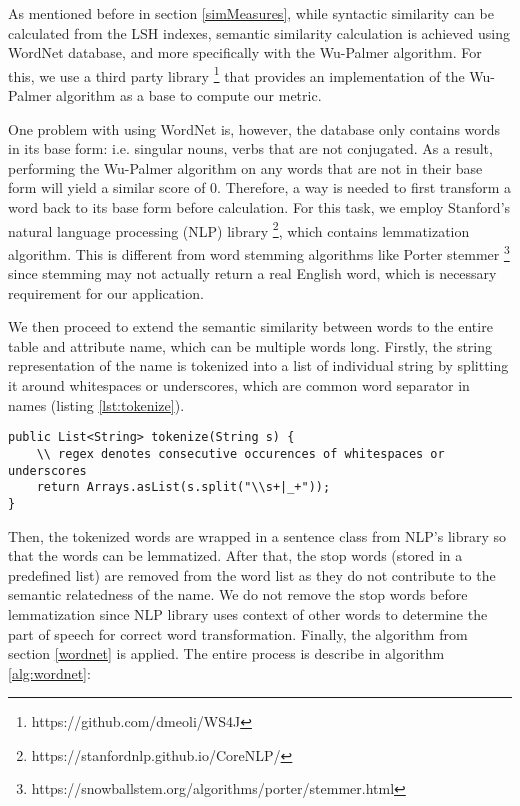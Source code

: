 As mentioned before in section \ref{simMeasures}, while syntactic similarity can be calculated from the LSH indexes, semantic similarity calculation is achieved using WordNet database, and more specifically with the Wu-Palmer algorithm. For this, we use a third party library \footnote{https://github.com/dmeoli/WS4J} that provides an implementation of the Wu-Palmer algorithm as a base to compute our metric.

One problem with using WordNet is, however, the database only contains words in its base form: i.e. singular nouns, verbs that are not conjugated. As a result, performing the Wu-Palmer algorithm on any words that are not in their base form will yield a similar score of 0. Therefore, a way is needed to first transform a word back to its base form before calculation. For this task, we employ Stanford's natural language processing (NLP) library \footnote{https://stanfordnlp.github.io/CoreNLP/}, which contains lemmatization algorithm. This is different from word stemming algorithms like Porter stemmer \footnote{https://snowballstem.org/algorithms/porter/stemmer.html} since stemming may not actually return a real English word, which is necessary requirement for our application.

We then proceed to extend the semantic similarity between words to the entire table and attribute name, which can be multiple words long. Firstly, the string representation of the name is tokenized into a list of individual string by splitting it around whitespaces or underscores, which are common word separator in names (listing \ref{lst:tokenize}).

\begin{lstlisting}[caption=tokenize() method, label=lst:tokenize]
public List<String> tokenize(String s) {
    \\ regex denotes consecutive occurences of whitespaces or underscores
    return Arrays.asList(s.split("\\s+|_+"));
}
\end{lstlisting}

Then, the tokenized words are wrapped in a sentence class from NLP's library so that the words can be lemmatized. After that, the stop words (stored in a predefined list) are removed from the word list as they do not contribute to the semantic relatedness of the name. We do not remove the stop words before lemmatization since NLP library uses context of other words to determine the part of speech for correct word transformation. Finally, the algorithm from section \ref{wordnet} is applied. The entire process is describe in algorithm \ref{alg:wordnet}:

